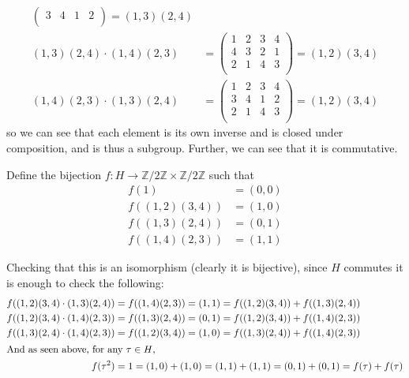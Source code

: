 \documentclass[12pt,letterpaper]{article}
\theoremstyle{definition}
\newcommand{\Z}{\mathbb{Z}}
\begin{document}
\begin{align*}
\begin{pmatrix}
                                  3 & 4 & 1 & 2 \\
                                \end{pmatrix} = (1,3)(2,4) \\
  (1,3)(2,4) \cdot (1,4)(2,3) &=
                                \begin{pmatrix}
                                  1 & 2 & 3 & 4 \\
                                  4 & 3 & 2 & 1 \\
                                  2 & 1 & 4 & 3 \\
                                \end{pmatrix} = (1,2)(3,4) \\
  (1,4)(2,3) \cdot (1,3)(2,4) &=
                                \begin{pmatrix}
                                  1 & 2 & 3 & 4 \\
                                  3 & 4 & 1 & 2 \\
                                  2 & 1 & 4 & 3 \\
                                \end{pmatrix} = (1,2)(3,4)
\end{align*}
so we can see that each element is its own inverse and is closed under composition, and is thus a subgroup. Further, we can see that it is commutative.

Define the bijection $f: H \rightarrow \Z/2\Z \times \Z/2\Z$ such that
\begin{align*}
  f(1) \ \ \ \ \ \ \ \ \ \ \ \ &= (0,0) \\
  f((1,2)(3,4)) &= (1,0) \\
  f((1,3)(2,4)) &= (0,1) \\
  f((1,4)(2,3)) &= (1,1)
\end{align*}

Checking that this is an isomorphism (clearly it is bijective), since $H$ commutes it is enough to check the following:
\begin{align*}
  f((1,2)(3,4) \cdot (1,3)(2,4)) &= f((1,4)(2,3)) = (1,1) = f((1,2)(3,4)) + f((1,3)(2,4)) \\
  f((1,2)(3,4) \cdot (1,4)(2,3)) &= f((1,3)(2,4)) = (0,1) = f((1,2)(3,4)) + f((1,4)(2,3)) \\
  f((1,3)(2,4) \cdot (1,4)(2,3)) &= f((1,2)(3,4)) = (1,0) = f((1,3)(2,4)) + f((1,4)(2,3)) \\
  \intertext{And as seen above, for any $\tau \in H$,}
  f(\tau^{2}) &= 1 = (1,0) + (1,0) = (1,1) + (1,1) = (0,1) + (0,1) = f(\tau) + f(\tau)
\end{align*}
\end{document}
